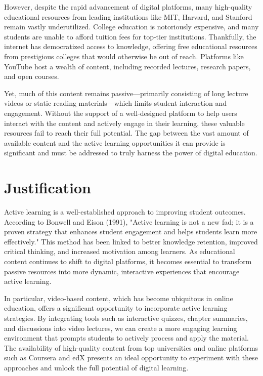 \documentclass[tcc,capa]{texufpel}
\begin{document}
However, despite the rapid advancement of digital platforms, many high-quality educational resources from leading institutions like MIT, Harvard, and Stanford remain vastly underutilized. College education is notoriously expensive, and many students are unable to afford tuition fees for top-tier institutions. Thankfully, the internet has democratized access to knowledge, offering free educational resources from prestigious colleges that would otherwise be out of reach. Platforms like YouTube host a wealth of content, including recorded lectures, research papers, and open courses.

Yet, much of this content remains passive—primarily consisting of long lecture videos or static reading materials—which limits student interaction and engagement. Without the support of a well-designed platform to help users interact with the content and actively engage in their learning, these valuable resources fail to reach their full potential. The gap between the vast amount of available content and the active learning opportunities it can provide is significant and must be addressed to truly harness the power of digital education.

\section{Justification}
Active learning is a well-established approach to improving student outcomes. According to Bonwell and Eison (1991), "Active learning is not a new fad; it is a proven strategy that enhances student engagement and helps students learn more effectively." This method has been linked to better knowledge retention, improved critical thinking, and increased motivation among learners. As educational content continues to shift to digital platforms, it becomes essential to transform passive resources into more dynamic, interactive experiences that encourage active learning.

In particular, video-based content, which has become ubiquitous in online education, offers a significant opportunity to incorporate active learning strategies. By integrating tools such as interactive quizzes, chapter summaries, and discussions into video lectures, we can create a more engaging learning environment that prompts students to actively process and apply the material. The availability of high-quality content from top universities and online platforms such as Coursera and edX presents an ideal opportunity to experiment with these approaches and unlock the full potential of digital learning.
\end{document}
